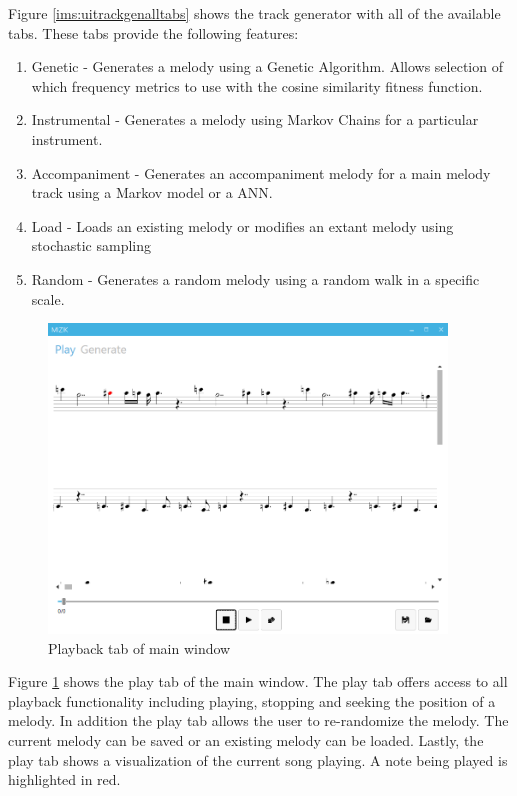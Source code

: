 Figure \ref{ims:uitrackgenalltabs} shows the track generator with all of the available tabs.
These tabs provide the following features:
\begin{enumerate}
\item Genetic - Generates a melody using a Genetic Algorithm. Allows selection of which frequency metrics to use with the cosine similarity fitness function.
\item Instrumental - Generates a melody using Markov Chains for a particular instrument.
\item Accompaniment - Generates an accompaniment melody for a main melody track using a Markov model or a \ac{ANN}.
\item Load - Loads an existing melody or modifies an extant melody using stochastic sampling
\item Random - Generates a random melody using a random walk in a specific scale.
\end{enumerate}

\begin{figure}
\centerline{\includegraphics[width=400px]{../images/res_ui_playback.png}}
\caption{Playback tab of main window}
\label{ims:res_ui_playback}
\end{figure}

Figure \ref{ims:res_ui_playback} shows the play tab of the main window. The play tab offers access to all playback functionality including playing, stopping and seeking the position of a melody.
In addition the play tab allows the user to re-randomize the melody. The current melody can be saved or an existing melody can be loaded.
Lastly, the play tab shows a visualization of the current song playing. A note being played is highlighted in red.

